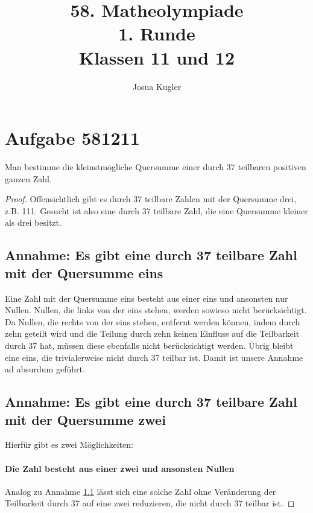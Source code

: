 \documentclass{article}
\title{58. Matheolympiade\\1. Runde\\Klassen 11 und 12}
\author{Josua Kugler}
\begin{document}
	\maketitle
	\section{Aufgabe 581211}
	Man bestimme die kleinstmögliche Quersumme einer durch 37 teilbaren positiven ganzen Zahl.
	\begin{proof}
	Offensichtlich gibt es durch 37 teilbare Zahlen mit der Quersumme drei, z.B. 111.
	Gesucht ist also eine durch 37 teilbare Zahl, die eine Quersumme kleiner als drei besitzt.
	\subsection{Annahme: Es gibt eine durch 37 teilbare Zahl mit der Quersumme eins}
	\label{annahme1}
	Eine Zahl mit der Quersumme eins besteht aus einer eins und ansonsten nur Nullen.
	Nullen, die links von der eins stehen, werden sowieso nicht berücksichtigt.
	Da Nullen, die rechts von der eins stehen, entfernt werden können, indem durch zehn geteilt wird und die Teilung durch zehn keinen Einfluss auf die Teilbarkeit durch 37 hat, müssen diese ebenfalls nicht berücksichtigt werden. Übrig bleibt eine eins, die trivialerweise nicht durch 37 teilbar ist.
	Damit ist unsere Annahme ad absurdum geführt.
	\subsection{Annahme: Es gibt eine durch 37 teilbare Zahl mit der Quersumme zwei}
	\label{annahme2}
	Hierfür gibt es zwei Möglichkeiten:
	\paragraph{Die Zahl besteht aus einer zwei und ansonsten Nullen}
	Analog zu Annahme \ref{annahme1} lässt sich eine solche Zahl ohne Veränderung der Teilbarkeit durch 37 auf eine zwei reduzieren, die nicht durch 37 teilbar ist.

\end{proof}
\end{document}
